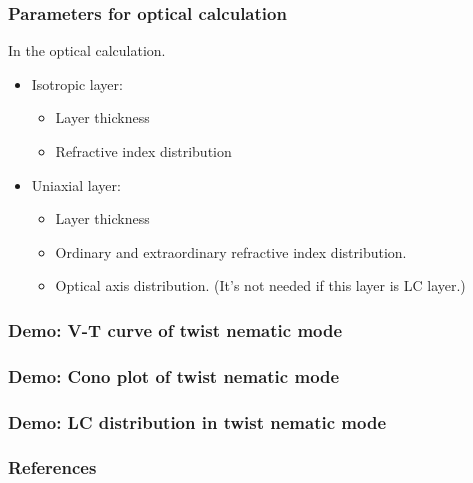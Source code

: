 \documentclass{beamer}
\begin{document}
\begin{frame}
\frametitle{Parameters for optical calculation}
In the optical calculation.
\begin{itemize}
\item Isotropic layer:
	\begin{itemize}
	\item Layer thickness
	\item Refractive index distribution 
	\end{itemize}
\item Uniaxial layer:
	\begin{itemize}
	\item Layer thickness
	\item Ordinary and extraordinary refractive index distribution.
	\item Optical axis distribution. (It's not needed if this layer is LC layer.)
	\end{itemize}
\end{itemize}
\end{frame}
\begin{frame}
\frametitle{Demo: V-T curve of twist nematic mode}
\end{frame}
\begin{frame}
\frametitle{Demo: Cono plot of twist nematic mode}
\end{frame}
\begin{frame}
\frametitle{Demo: LC distribution in twist nematic mode}
\end{frame}
\begin{frame}
\frametitle{References}
\begin{thebibliography}{0}
\end{thebibliography}
\end{frame}
\end{document}
